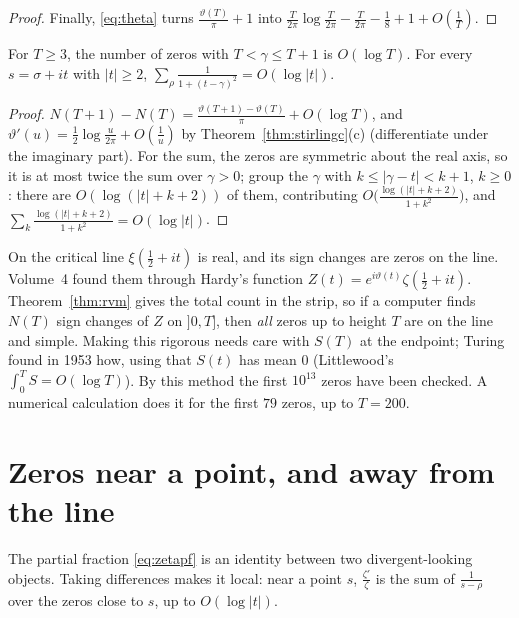 \begin{proof}
Finally, \eqref{eq:theta} turns $\frac{\vartheta(T)}\pi+1$ into $\frac T{2\pi}\log\frac T{2\pi}-\frac T{2\pi}-\frac18+1+O(\frac1T)$.
\end{proof}

\begin{corollary}\label{cor:nunit}
For $T\ge3$, the number of zeros with $T<\gamma\le T+1$ is $O(\log T)$. For every $s=\sigma+it$ with $|t|\ge2$, $\sum_\rho\frac1{1+(t-\gamma)^2}=O(\log|t|)$.
\end{corollary}
\begin{proof}
$N(T+1)-N(T)=\frac{\vartheta(T+1)-\vartheta(T)}\pi+O(\log T)$, and $\vartheta'(u)=\frac12\log\frac u{2\pi}+O(\frac1u)$ by Theorem~\ref{thm:stirlingc}(c) (differentiate under the imaginary part). For the
sum, the zeros are symmetric about the real axis, so it is at most twice the sum over $\gamma>0$; group the $\gamma$ with $k\le|\gamma-t|<k+1$, $k\ge0$: there are $O(\log(|t|+k+2))$ of them, contributing
$O\bigl(\frac{\log(|t|+k+2)}{1+k^2}\bigr)$, and $\sum_k\frac{\log(|t|+k+2)}{1+k^2}=O(\log|t|)$.
\end{proof}

\begin{remark}
On the critical line $\xi(\frac12+it)$ is real, and its sign changes are zeros on the line. Volume~4 found them through Hardy's function $Z(t)=e^{i\vartheta(t)}\zeta(\frac12+it)$. Theorem~\ref{thm:rvm}
gives the total count in the strip, so if a computer finds $N(T)$ sign changes of $Z$ on $]0,T]$, then \emph{all} zeros up to height $T$ are on the line and simple. Making this rigorous
needs care with $S(T)$ at the endpoint; Turing found in 1953 how, using that $S(t)$ has mean $0$ (Littlewood's $\int_0^TS=O(\log T)$). By this method the first $10^{13}$ zeros have been
checked. A numerical calculation does it for the first $79$ zeros, up to $T=200$.
\end{remark}

\section{Zeros near a point, and away from the line}

The partial fraction \eqref{eq:zetapf} is an identity between two divergent-looking objects. Taking differences makes it local: near a point $s$, $\frac{\zeta'}\zeta$ is the
sum of $\frac1{s-\rho}$ over the zeros close to $s$, up to $O(\log|t|)$.

